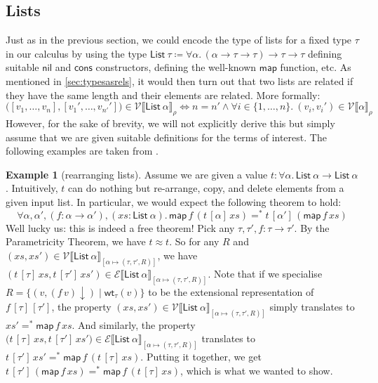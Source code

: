 \documentclass[12pt]{article}
\theoremstyle{plain}
\theoremstyle{definition}
\newtheorem{exmpl}[equation]{Example}
\newcommand{\fromto}[2]{\{#1,\dotsc,#2\}}
\newcommand{\denot}[1]{\llbracket#1\rrbracket}
\newcommand{\listt}[1]{\mathsf{List}~#1}
\newcommand{\map}{\mathsf{map}}
\newcommand{\vint}[1]{\mathcal{V}\denot{#1}}
\newcommand{\tint}[1]{\mathcal{E}\denot{#1}}
\newcommand{\wt}[1]{\mathsf{wt}_{#1}}
\newcommand{\nil}{\mathsf{nil}}
\newcommand{\cons}{\mathsf{cons}}
\newcommand{\nf}[1]{#1{\downarrow}}
\newcommand{\eqnf}{=^*}
\begin{document}
\subsection{Lists}
Just as in the previous section, we could encode the type of lists for a fixed type $\tau$
in our calculus by using the type $\listt{\tau}\coloneqq \forall \alpha.\, (\alpha\to\tau\to\tau)\to\tau\to\tau$
defining suitable $\nil$ and $\cons$ constructors, defining the well-known $\map$ function, etc.
As mentioned in \cref{sec:typesasrels},
it would then turn out that two lists are related if they have the same length and their elements are related.
More formally:
\begin{equation*}
\bigl([v_1,\dotsc,v_n],[v_1',\dotsc,v_{n'}']\bigr)\in \vint{\listt{\alpha}}_\rho \iff n = n' \land \forall i\in\fromto{1}{n}.\ (v_i,v_i')\in \vint{\alpha}_\rho
\end{equation*}
However, for the sake of brevity, we will not explicitly derive this but simply assume that we are given suitable definitions for the terms of interest.
The following examples are taken from \citet{wadler1989theorems}.
\begin{exmpl}[rearranging lists]
Assume we are given a value
$t : \forall \alpha.\, \listt{\alpha}\to\listt{\alpha}$.
Intuitively, $t$ can do nothing but re-arrange, copy, and delete elements from a given input list.
In particular, we would expect the following theorem to hold:
\begin{equation*}
  \forall \alpha,\alpha',(f : \alpha\to\alpha'),(xs : \listt{\alpha}).\, \map\,f\,(t\,[\alpha]\,xs)\eqnf t\,[\alpha']\,(\map\,f\,xs)
\end{equation*}
Well lucky us: this is indeed a free theorem!
Pick any $\tau,\tau',f : \tau\to\tau'$.
By the Parametricity Theorem, we have $t\approx t$.
So for any $R$ and $(xs,xs')\in\vint{\listt{\alpha}}_{[\alpha\mapsto(\tau,\tau',R)]}$, we have $(t\,[\tau]\, xs,t\,[\tau']\, xs')\in\tint{\listt{\alpha}}_{[\alpha\mapsto(\tau,\tau',R)]}$.
Note that if we specialise $R=\bigl\{(v,\nf{(f\, v)})\mid \wt{\tau}(v)\bigr\}$
to be the extensional representation of $f\,[\tau]\,[\tau']$,
the property $(xs,xs')\in\vint{\listt{\alpha}}_{[\alpha\mapsto(\tau,\tau',R)]}$
simply translates to $xs'\eqnf \map\, f\, xs$.
And similarly, the property
$\bigl(t\,[\tau]\, xs,t\,[\tau']\, xs'\bigr)\in\tint{\listt{\alpha}}_{[\alpha\mapsto(\tau,\tau',R)]}$
translates to
$t\, [\tau']\,xs' \eqnf \map\,f\,(t\,[\tau]\, xs)$.
Putting it together, we get $t\, [\tau']\,(\map\, f\, xs) \eqnf \map\,f\,(t\,[\tau]\, xs)$,
which is what we wanted to show.
\end{exmpl}
\end{document}
